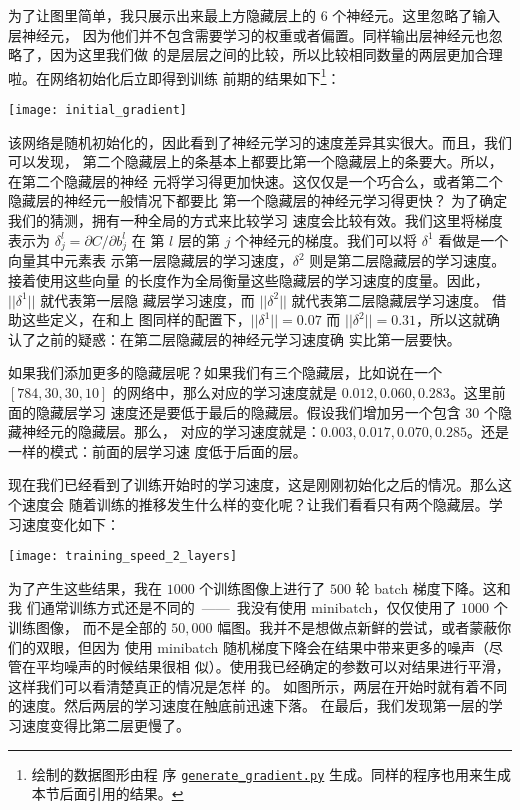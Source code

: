 为了让图里简单，我只展示出来最上方隐藏层上的 $6$ 个神经元。这里忽略了输入层神经元，
因为他们并不包含需要学习的权重或者偏置。同样输出层神经元也忽略了，因为这里我们做
的是层层之间的比较，所以比较相同数量的两层更加合理啦。在网络初始化后立即得到训练
前期的结果如下\footnote{绘制的数据图形由程
  序
  \href{https://github.com/mnielsen/neural-networks-and-deep-learning/blob/master/fig/generate_gradient.py}{\lstinline!generate_gradient.py!}
  生成。同样的程序也用来生成本节后面引用的结果。}：
\begin{center}
  \texttt{[image: initial\_gradient]}
\end{center}

该网络是随机初始化的，因此看到了神经元学习的速度差异其实很大。而且，我们可以发现，
第二个隐藏层上的条基本上都要比第一个隐藏层上的条要大。所以，在第二个隐藏层的神经
元将学习得更加快速。这仅仅是一个巧合么，或者第二个隐藏层的神经元一般情况下都要比
第一个隐藏层的神经元学习得更快？ 为了确定我们的猜测，拥有一种全局的方式来比较学习
速度会比较有效。我们这里将梯度表示为 $\delta_j^l = \partial C/\partial b_j^l$ 在
第 $l$ 层的第 $j$ 个神经元的梯度。我们可以将 $\delta^1$ 看做是一个向量其中元素表
示第一层隐藏层的学习速度，$\delta^2$ 则是第二层隐藏层的学习速度。接着使用这些向量
的长度作为全局衡量这些隐藏层的学习速度的度量。因此，$||\delta^1||$ 就代表第一层隐
藏层学习速度，而 $||\delta^2||$ 就代表第二层隐藏层学习速度。 借助这些定义，在和上
图同样的配置下，$||\delta^1|| = 0.07$ 而
$||\delta^2|| = 0.31$，所以这就确认了之前的疑惑：在第二层隐藏层的神经元学习速度确
实比第一层要快。
 
如果我们添加更多的隐藏层呢？如果我们有三个隐藏层，比如说在一个 $[784, 30, 30,
10]$ 的网络中，那么对应的学习速度就是 $0.012, 0.060, 0.283$。这里前面的隐藏层学习
速度还是要低于最后的隐藏层。假设我们增加另一个包含 30 个隐藏神经元的隐藏层。那么，
对应的学习速度就是：$0.003, 0.017, 0.070, 0.285$。还是一样的模式：前面的层学习速
度低于后面的层。

现在我们已经看到了训练开始时的学习速度，这是刚刚初始化之后的情况。那么这个速度会
随着训练的推移发生什么样的变化呢？让我们看看只有两个隐藏层。学习速度变化如下：
\begin{center}
  \texttt{[image: training\_speed\_2\_layers]}
\end{center}
 
为了产生这些结果，我在 $1000$ 个训练图像上进行了 $500$ 轮 batch 梯度下降。这和我
们通常训练方式还是不同的~——~我没有使用 minibatch，仅仅使用了 $1000$ 个训练图像，
而不是全部的 $50,000$ 幅图。我并不是想做点新鲜的尝试，或者蒙蔽你们的双眼，但因为
使用 minibatch 随机梯度下降会在结果中带来更多的噪声（尽管在平均噪声的时候结果很相
似）。使用我已经确定的参数可以对结果进行平滑，这样我们可以看清楚真正的情况是怎样
的。 如图所示，两层在开始时就有着不同的速度。然后两层的学习速度在触底前迅速下落。
在最后，我们发现第一层的学习速度变得比第二层更慢了。
 
